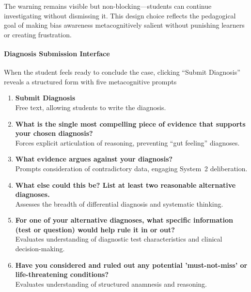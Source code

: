 The warning remains visible but non-blocking—students can continue investigating without dismissing it. This design choice reflects the pedagogical goal of making bias awareness metacognitively salient without punishing learners or creating frustration.

\paragraph{Diagnosis Submission Interface}

When the student feels ready to conclude the case, clicking ``Submit Diagnosis'' reveals a structured form with five metacognitive prompts

\begin{enumerate}
  \item \textbf{Submit Diagnosis} \\
  Free text, allowing students to write the diagnosis.
  \item \textbf{What is the single most compelling piece of evidence that supports your chosen diagnosis? } \\
  Forces explicit articulation of reasoning, preventing ``gut feeling'' diagnoses.
  \item \textbf{What evidence argues against your diagnosis?} \\
  Prompts consideration of contradictory data, engaging System~2 deliberation.
  \item \textbf{What else could this be? List at least two reasonable alternative diagnoses. } \\
  Assesses the breadth of differential diagnosis and systematic thinking.
  \item \textbf{For one of your alternative diagnoses, what specific information (test or question) would help rule it in or out?} \\
  Evaluates understanding of diagnostic test characteristics and clinical decision-making.
  \item \textbf{Have you considered and ruled out any potential 'must-not-miss' or life-threatening conditions?} \\
  Evaluates understanding of structured anamnesis and reasoning.
\end{enumerate}

